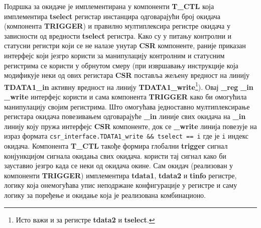 Подршка за окидаче је имплементирана у компоненти \textbf{T\_CTL} која имплементира \textbf{tselect} регистар инстанцира одговарајући број окидача (компонента \textbf{TRIGGER}) и правилно мултиплексира регистре окидача у зависности од вредности \textbf{tselect} регистра. Како су у питању контролни и статусни регистри који се не налазе унутар \textbf{CSR} компоненте, раније приказан интерфејс који језгро користи за манипулацију контролним и статусним регистрима се користи у обрнутом смеру (при извршавању инструкције која модификује неки од ових регистара \textbf{CSR} поставља жељену вредност на линију \textbf{TDATA1\_in} активну вредност на линију \textbf{TDATA1\_write}\footnote{Исто важи и за регистре \textbf{tdata2} и \textbf{tselect}.}).
Овај \textbf{\_reg} \textbf{\_in} \textbf{\_write} интерфејс користи и сама компонента \textbf{TRIGGER} како би омогућила манипулацију својим регистрима. Што омогућава једноставно мултиплексирање регистара окидача повезивањем одговарајуће \textbf{\_in} линије свих окидача на \textbf{\_in} линију коју пружа интерфејс \textbf{CSR} компоненте, док се \textbf{\_write} линија повезује на израз формата \lstinline[columns=fixed]{csr_interface.TDATA1_write && tselect == i} где је \lstinline[columns=fixed]{i} индекс окидача.
Компонента \textbf{T\_CTL} такође формира глобални \textbf{trigger} сигнал конјункцијом сигнала окидања свих окидача.  користи тај сигнал како би зауставио језгро када се неки од окидача окине.
Сам окидач (реализован у компоненти \textbf{TRIGGER}) имплементира \textbf{tdata1}, \textbf{tdata2} и \textbf{tinfo} регистре, логику која онемогућава упис неподржане конфигурације у регистре и саму логику за поређење и окидање која је реализована комбинационо.